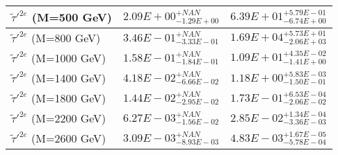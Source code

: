 \documentclass{article}
\begin{document}
\begin{center}
\begin{tabular}{ |l|c|c| }
 \hline
 $\tilde{\tau}'^{2e}$ (M=500 GeV) & $2.09E+00^{+NAN}_{-1.29E+00}$ & $6.39E+01^{+5.79E-01}_{-6.74E+00}$ \\
 \hline
 $\tilde{\tau}'^{2e}$ (M=800 GeV) & $3.46E-01^{+NAN}_{-3.33E-01}$ & $1.69E+04^{+5.73E+01}_{-2.06E+03}$ \\
 \hline
 $\tilde{\tau}'^{2e}$ (M=1000 GeV) & $1.58E-01^{+NAN}_{-1.84E-01}$ & $1.09E+01^{+4.35E-02}_{-1.41E+00}$ \\
 \hline
 $\tilde{\tau}'^{2e}$ (M=1400 GeV) & $4.18E-02^{+NAN}_{-6.66E-02}$ & $1.18E+00^{+5.83E-03}_{-1.50E-01}$ \\
 \hline
 $\tilde{\tau}'^{2e}$ (M=1800 GeV) & $1.44E-02^{+NAN}_{-2.95E-02}$ & $1.73E-01^{+6.53E-04}_{-2.06E-02}$ \\
 \hline
 $\tilde{\tau}'^{2e}$ (M=2200 GeV) & $6.27E-03^{+NAN}_{-1.56E-02}$ & $2.85E-02^{+1.34E-04}_{-3.36E-03}$ \\
 \hline
 $\tilde{\tau}'^{2e}$ (M=2600 GeV) & $3.09E-03^{+NAN}_{-8.93E-03}$ & $4.83E-03^{+1.67E-05}_{-5.78E-04}$ \\
 \hline
 \end{tabular}
 \end{center}
 
\end{document}
